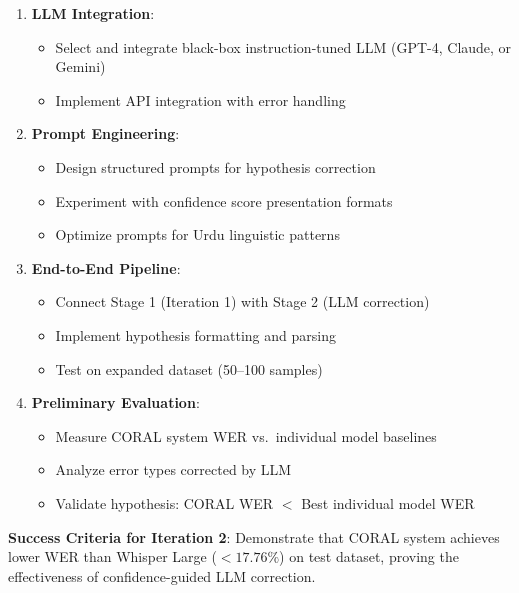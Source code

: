 \begin{enumerate}
    \item \textbf{LLM Integration}:
    \begin{itemize}
        \item Select and integrate black-box instruction-tuned LLM (GPT-4, Claude, or Gemini)
        \item Implement API integration with error handling
    \end{itemize}
    
    \item \textbf{Prompt Engineering}:
    \begin{itemize}
        \item Design structured prompts for hypothesis correction
        \item Experiment with confidence score presentation formats
        \item Optimize prompts for Urdu linguistic patterns
    \end{itemize}
    
    \item \textbf{End-to-End Pipeline}:
    \begin{itemize}
        \item Connect Stage 1 (Iteration 1) with Stage 2 (LLM correction)
        \item Implement hypothesis formatting and parsing
        \item Test on expanded dataset (50--100 samples)
    \end{itemize}
    
    \item \textbf{Preliminary Evaluation}:
    \begin{itemize}
        \item Measure CORAL system WER vs.\ individual model baselines
        \item Analyze error types corrected by LLM
        \item Validate hypothesis: CORAL WER $<$ Best individual model WER
    \end{itemize}
\end{enumerate}

\textbf{Success Criteria for Iteration 2}: Demonstrate that CORAL system achieves lower WER than Whisper Large ($< 17.76\%$) on test dataset, proving the effectiveness of confidence-guided LLM correction.